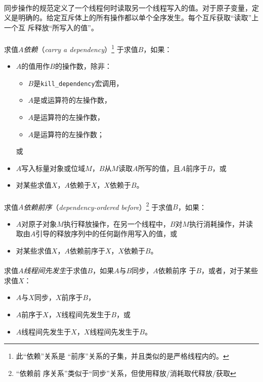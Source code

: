 \paragraph{}
\notes 同步操作的规范定义了一个线程何时读取另一个线程写入的值。对于原子变量，定
义是明确的。给定互斥体上的所有操作都以单个全序发生。每个互斥获取``读取''上一个互
斥释放``所写入的值''。

\paragraph{}
求值$A$\textit{依赖}（\textit{carry a dependency}）\footnote{此``依赖''关系是
``前序''关系的子集，并且类似的是严格线程内的。} 于求值$B$，如果：
\begin{itemize}
  \item{$A$的值用作$B$的操作数，除非：
    \begin{itemize}
      \item{$B$是\texttt{kill\_dependency}宏调用，}
      \item{$A$是\tm{\&\&}或\tm{||}运算符的左操作数，}
      \item{$A$是运算符的左操作数，}
      \item{$A$是\tm{,}运算符的左操作数；}
    \end{itemize}
    或}
  \item{$A$写入标量对象或位域$M$，$B$从$M$读取$A$所写的值，且$A$前序于$B$，或}
  \item{对某些求值$X$，$A$依赖于$X$，$X$依赖于$B$。}
\end{itemize}

\paragraph{}
求值$A$\textit{依赖前序}（\textit{dependency-ordered before}）\footnote{``依赖前
序关系''类似于``同步''关系，但使用释放/消耗取代释放/获取} 于求值$B$，如果：
\begin{itemize}
  \item{$A$对原子对象$M$执行释放操作，在另一个线程中，$B$对$M$执行消耗操作，并读
    取由$A$引导的释放序列中的任何副作用写入的值，或}
  \item{对某些求值$X$，$A$依赖前序于$X$，$X$依赖于$B$。}
\end{itemize}

\paragraph{}
求值$A$\textit{线程间先发生}于求值$B$，如果$A$与$B$同步，$A$依赖前序
于$B$，或者，对于某些求值$X$：
\begin{itemize}
  \item{$A$与$X$同步，$X$前序于$B$，}
  \item{$A$前序于$X$，$X$线程间先发生于$B$，或}
  \item{$A$线程间先发生于$X$，$X$线程间先发生于$B$。}
\end{itemize}

